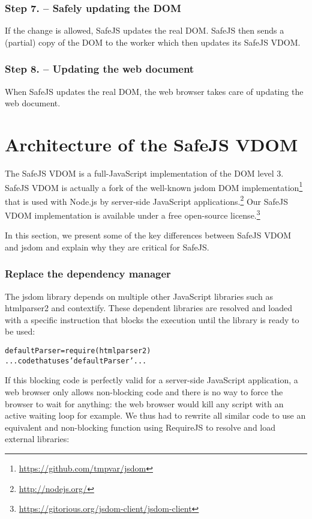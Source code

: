 \documentclass{article}
\newcommand{\ct}[1]{{\textsf{#1}}\xspace}
\newenvironment{code}
    {\begin{alltt}\sffamily}
    {\end{alltt}\normalsize}
\newcommand{\js}{JavaScript\xspace}
\newcommand{\safejs}{SafeJS\xspace}
\newcommand{\dom}{DOM\xspace}
\newcommand{\vdom}{\safejs VDOM\xspace}
\newcommand{\requirejs}{RequireJS\xspace}
\newcommand{\jsdom}{jsdom\xspace}
\begin{document}
\subsubsection*{Step 7. -- Safely updating the \dom}

If the change is allowed, \safejs updates the real \dom. \safejs then
sends a (partial) copy of the \dom to the worker which then updates its
\vdom.

\subsubsection*{Step 8. -- Updating the web document}

When \safejs updates the real \dom, the web browser takes care of
updating the web document.

\section{Architecture of the \vdom}

The \vdom is a full-\js implementation of the \dom\cite{DOM98} level
3. \vdom is actually a fork of the well-known \jsdom \dom
implementation\footnote{\url{https://github.com/tmpvar/jsdom}} that is
used with Node.js by server-side \js
applications.\footnote{\url{http://nodejs.org/}} Our \vdom
implementation is available under a free open-source
license.\footnote{\url{https://gitorious.org/jsdom-client/jsdom-client}}

In this section, we present some of the key differences between \vdom
and \jsdom and explain why they are critical for \safejs.

\subsubsection*{Replace the dependency manager}

The \jsdom library depends on multiple other \js libraries such as
\ct{htmlparser2} and \ct{contextify}. These dependent libraries are
resolved and loaded with a specific instruction that blocks the
execution until the library is ready to be used:

\begin{code}{}
defaultParser = require(htmlparser2)
... code that uses 'defaultParser'...
\end{code}

If this blocking code is perfectly valid for a server-side \js
application, a web browser only allows non-blocking code and there is
no way to force the browser to wait for anything: the web browser
would kill any script with an active waiting loop for example. We thus had to
rewrite all similar code to use an equivalent and non-blocking
function using \requirejs to resolve and load external libraries:
\end{document}
